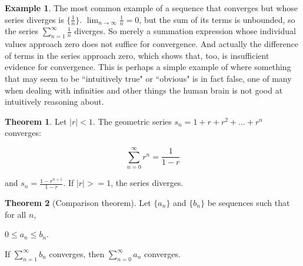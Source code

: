 \documentclass{article}
\theoremstyle{definition}
\newtheorem{example}{Example}[section]
\newtheorem{theorem}{Theorem}[section]
\begin{document}
\begin{example} \label{harmonic-series-divergence}
The most common example of a sequence that converges but whose series diverges is $\{\frac{1}{n}\}$. $\lim_{n \to \infty} \frac{1}{n} = 0$, but the sum of its terms is unbounded, so the series $\sum\limits_{n=1}^\infty \frac{1}{n}$ diverges. So merely a summation expression whose individual values approach zero does not suffice for convergence. And actually the difference of terms in the series approach zero, which shows that, too, is insufficient evidence for convergence. This is perhaps a simple example of where something that may seem to be ``intuitively true" or ``obvious" is in fact false, one of many when dealing with infinities and other things the human brain is not good at intuitively reasoning about.
\end{example}

\begin{theorem} \label{geometric-series}
Let $|r| < 1$. The geometric series $s_n = 1 + r + r^2 + \ldots + r^n$ converges:

\begin{equation}
\sum\limits_{n=0}^\infty r^n = \frac{1}{1-r}
\end{equation}

and $s_n = \frac{1 - r^{n+1}}{1 - r}$. If $|r| >= 1$, the series diverges.
\end{theorem}

\begin{theorem}[Comparison theorem]
Let $\{a_n\}$ and $\{b_n\}$ be sequences such that for all $n$,

\begin{center}
$0 \leq a_n \leq b_n$.
\end{center}

If $\sum\limits_{n=1}^\infty b_n$ converges, then $\sum\limits_{n=0}^\infty a_n$ converges.
\end{theorem}
\end{document}
